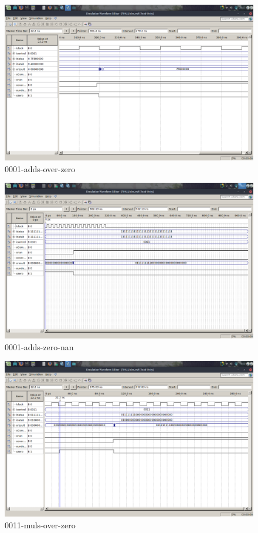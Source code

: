 \documentclass[12pt]{article}
\begin{document}
\begin{figure}[H]
	\centering
	\includegraphics[width=.8\textwidth]{imagens2/0001-adds-over-zero.png}
	\caption{0001-adds-over-zero}
	\label{fig:0001-adds-over-zero}
\end{figure}

\begin{figure}[H]
	\centering
	\includegraphics[width=.8\textwidth]{imagens2/0001-adds-zero-nan.png}
	\caption{0001-adds-zero-nan}
	\label{fig:0001-adds-zero-nan}
\end{figure}

\begin{figure}[H]
	\centering
	\includegraphics[width=.8\textwidth]{imagens2/0011-muls-over-zero.png}
	\caption{0011-muls-over-zero}
	\label{fig:0011-muls-over-zero}
\end{figure}
\end{document}
